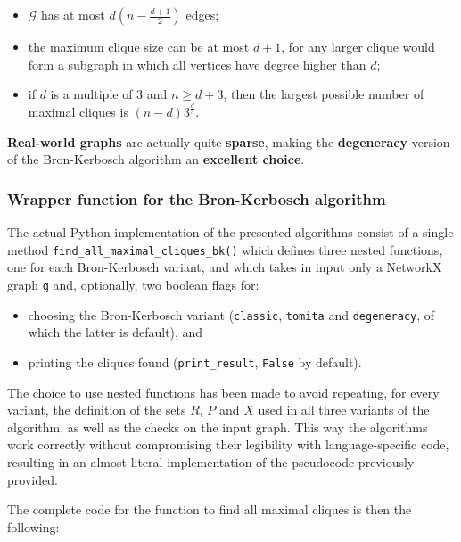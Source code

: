 \documentclass[11pt]{article}
\begin{document}
\begin{itemize}
    \item \(\mathcal{G}\) has at most \(d(n-\frac{d+1}{2})\) edges; \item the
maximum clique size can be at most \(d+1\), for any larger clique would
form a subgraph in which all vertices have degree higher than \(d\); \item if \(d\) is a multiple of \(3\) and \(n \geq d+3\), then the largest
possible number of maximal cliques is \((n-d)3^{\frac{d}{3}}\).
\end{itemize}

\textbf{Real-world graphs} are actually quite \textbf{sparse}, making
the \textbf{degeneracy} version of the Bron-Kerbosch algorithm an
\textbf{excellent choice}.

    \hypertarget{wrapper-function-for-the-bron-kerbosch-algorithm}{%
\subsubsection*{Wrapper function for the Bron-Kerbosch
algorithm}\label{wrapper-function-for-the-bron-kerbosch-algorithm}}

The actual Python implementation of the presented algorithms consist of
a single method \texttt{find\_all\_maximal\_cliques\_bk()} which defines
three nested functions, one for each Bron-Kerbosch variant, and which
takes in input only a NetworkX graph \texttt{g} and, optionally, two
boolean flags for:

\begin{itemize}
    \item choosing the Bron-Kerbosch variant
(\texttt{classic}, \texttt{tomita} and \texttt{degeneracy}, of which the
latter is default), and \item printing the cliques found
(\texttt{print\_result}, \texttt{False} by default).
\end{itemize}

The choice to use nested functions has been made to avoid repeating, for
every variant, the definition of the sets \(R\), \(P\) and \(X\) used in
all three variants of the algorithm, as well as the checks on the input
graph. This way the algorithms work correctly without compromising their
legibility with language-specific code, resulting in an almost literal
implementation of the pseudocode previously provided.

The complete code for the function to find all maximal cliques is then
the following:
\end{document}

